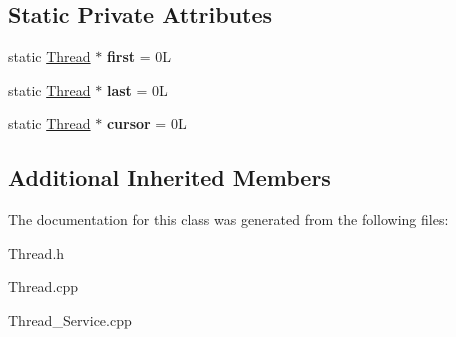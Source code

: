 \subsection*{Static Private Attributes}
\begin{DoxyCompactItemize}
\item 
\mbox{\label{class_thread_ab69a9bc494eb5cd91e1649cc6b4f062a}} 
static \hyperlink{class_thread}{Thread} $\ast$ {\bfseries first} = 0L
\item 
\mbox{\label{class_thread_a95ed7b175696d6f73727244288f050d6}} 
static \hyperlink{class_thread}{Thread} $\ast$ {\bfseries last} = 0L
\item 
\mbox{\label{class_thread_a24f3f5a44c7e373faed04df0393935ef}} 
static \hyperlink{class_thread}{Thread} $\ast$ {\bfseries cursor} = 0L
\end{DoxyCompactItemize}
\subsection*{Additional Inherited Members}


The documentation for this class was generated from the following files\+:\begin{DoxyCompactItemize}
\item 
Thread.\+h\item 
Thread.\+cpp\item 
Thread\+\_\+\+Service.\+cpp\end{DoxyCompactItemize}

